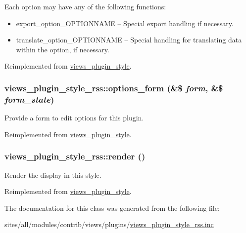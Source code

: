  Each option may have any of the following functions:\begin{itemize}
\item export\_\-option\_\-OPTIONNAME -- Special export handling if necessary.\item translate\_\-option\_\-OPTIONNAME -- Special handling for translating data within the option, if necessary. \end{itemize}


Reimplemented from \hyperlink{classviews__plugin__style_95b6f2eadf403ff36f1ff2860294b3c2}{views\_\-plugin\_\-style}.\hypertarget{classviews__plugin__style__rss_317b1867ddd97f969977368031e04fee}{
\subsubsection[{options\_\-form}]{\setlength{\rightskip}{0pt plus 5cm}views\_\-plugin\_\-style\_\-rss::options\_\-form (\&\$ {\em form}, \/  \&\$ {\em form\_\-state})}}
\label{classviews__plugin__style__rss_317b1867ddd97f969977368031e04fee}


Provide a form to edit options for this plugin. 

Reimplemented from \hyperlink{classviews__plugin__style_fe3d437ff4398315b15c4e60975dbb1c}{views\_\-plugin\_\-style}.\hypertarget{classviews__plugin__style__rss_a6331538ac5b9cdc80478f98ba5e0de4}{
\subsubsection[{render}]{\setlength{\rightskip}{0pt plus 5cm}views\_\-plugin\_\-style\_\-rss::render ()}}
\label{classviews__plugin__style__rss_a6331538ac5b9cdc80478f98ba5e0de4}


Render the display in this style. 

Reimplemented from \hyperlink{classviews__plugin__style_a52b618e91b11a7d10ad1feadbc891f1}{views\_\-plugin\_\-style}.

The documentation for this class was generated from the following file:\begin{CompactItemize}
\item 
sites/all/modules/contrib/views/plugins/\hyperlink{views__plugin__style__rss_8inc}{views\_\-plugin\_\-style\_\-rss.inc}\end{CompactItemize}
